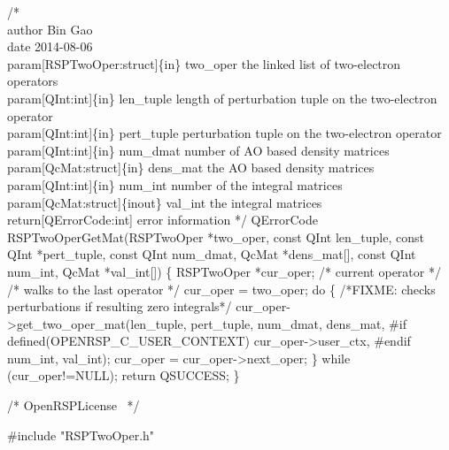 /*%
    \\author Bin Gao
    \\date 2014-08-06
    \\param[RSPTwoOper:struct]\{in\} two_oper the linked list of two-electron operators
    \\param[QInt:int]\{in\} len_tuple length of perturbation tuple on the two-electron operator
    \\param[QInt:int]\{in\} pert_tuple perturbation tuple on the two-electron operator
    \\param[QInt:int]\{in\} num_dmat number of AO based density matrices
    \\param[QcMat:struct]\{in\} dens_mat the AO based density matrices
    \\param[QInt:int]\{in\} num_int number of the integral matrices
    \\param[QcMat:struct]\{inout\} val_int the integral matrices
    \\return[QErrorCode:int] error information
*/
QErrorCode RSPTwoOperGetMat(RSPTwoOper *two_oper,
                            const QInt len_tuple,
                            const QInt *pert_tuple,
                            const QInt num_dmat,
                            QcMat *dens_mat[],
                            const QInt num_int,
                            QcMat *val_int[])
\{
    RSPTwoOper *cur_oper;  /* current operator */
    /* walks to the last operator */
    cur_oper = two_oper;
    do \{
/*FIXME: checks perturbations if resulting zero integrals*/
        cur_oper->get_two_oper_mat(len_tuple,
                                   pert_tuple,
                                   num_dmat,
                                   dens_mat,
#if defined(OPENRSP_C_USER_CONTEXT)
                                   cur_oper->user_ctx,
#endif
                                   num_int,
                                   val_int);
        cur_oper = cur_oper->next_oper;
    \} while (cur_oper!=NULL);
    return QSUCCESS;
\}

\nwendcode{}\endmoddef
/*
  \LA{}OpenRSPLicense~{\nwtagstyle{}}\RA{}
*/

#include "RSPTwoOper.h"


